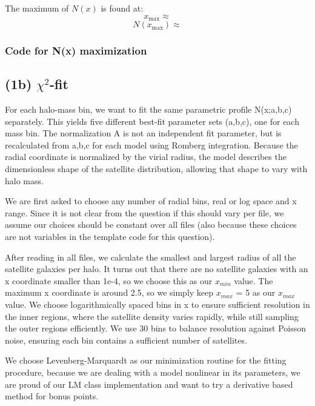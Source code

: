 \documentclass{article}
\newcommand{\CodeDir}{Code}
\newcommand{\CalcDir}{Calculations}
\begin{document}
The maximum of \(N(x)\) is found at:
$$x_{\text{max}} \approx   $$
$$N(x_{\text{max}}) \approx   $$

\subsubsection{Code for N(x) maximization}


\subsection{(1b) $\chi^2$-fit}

For each halo-mass bin, we want to fit the same parametric profile N(x;a,b,c) separately. This yields five different best-fit parameter sets (a,b,c), one for each mass bin.
The normalization A is not an independent fit parameter, but is recalculated from a,b,c for each model using Romberg integration.
Because the radial coordinate is normalized by the virial radius, the model describes the dimensionless shape of the satellite distribution, allowing that shape to vary with halo mass.

We are first asked to choose any number of radial bins, real or log space and x range.
Since it is not clear from the question if this should vary per file, we assume our choices should be constant over all files (also because these choices are not variables in the template code for this question).

After reading in all files, we calculate the smallest and largest radius of all the satellite galaxies per halo.
It turns out that there are no satellite galaxies with an x coordinate smaller than 1e-4, so we choose this as our $x_{min}$ value.
The maximum x coordinate is around 2.5, so we simply keep $x_{max}$ = 5 as our $x_{max}$ value.
We choose logarithmically spaced bins in x to ensure sufficient resolution in the inner regions, where the satellite density varies rapidly, while still sampling the outer regions efficiently.
We use 30 bins to balance resolution against Poisson noise, ensuring each bin contains a sufficient number of satellites.

We choose Levenberg-Marquardt as our minimization routine for the fitting procedure, because we are dealing with a model nonlinear in its parameters,
we are proud of our LM class implementation and want to try a derivative based method for bonus points.
\end{document}
